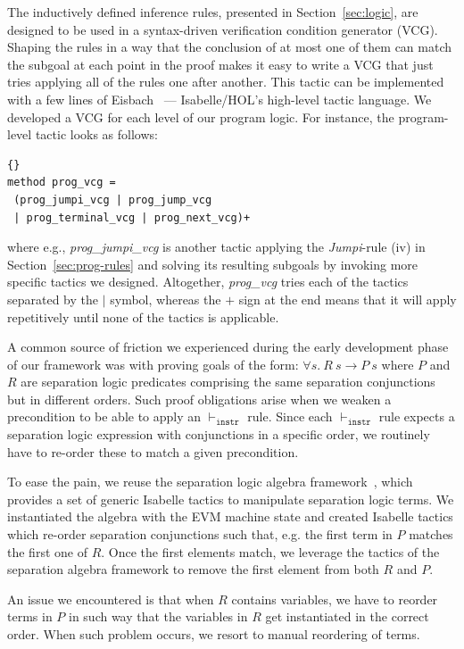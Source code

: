 \documentclass[sigplan,10pt]{acmart}\settopmatter{printfolios=true,printccs=false,printacmref=false}
\begin{document}
The inductively defined inference rules, presented in Section~\ref{sec:logic},
are designed to be used in a syntax-driven verification
condition generator (VCG).
Shaping the rules in a way that the conclusion of at most one of them
can match the subgoal at each point in the
proof makes it easy to write a VCG that just tries applying all of the rules
one after another.
This tactic can be implemented with a few lines of Eisbach~\cite{Matichuk_MW_16} ---
Isabelle/HOL's high-level tactic language.
We developed a VCG for each level of our program logic.
For instance, the program-level tactic looks as follows:
\begin{lstlisting}[language=Isar]{}
method prog_vcg =
 (prog_jumpi_vcg | prog_jump_vcg
 | prog_terminal_vcg | prog_next_vcg)+
\end{lstlisting}
where e.g., \textit{prog\_jumpi\_vcg} is another tactic applying the \textit{Jumpi}-rule (iv) 
in Section~\ref{sec:prog-rules} and solving its resulting subgoals by
invoking more specific tactics we designed.
Altogether, \textit{prog\_vcg} tries each of the tactics separated by the $|$ symbol,
whereas the $+$ sign at the end means that it will apply repetitively until
none of the tactics is applicable. 

A common source of friction we experienced during the early development phase
of our framework was with proving goals of the form:
$\forall s.\: R\:s \longrightarrow P\:s$ where $P$ and $R$ are separation logic predicates
comprising the same separation conjunctions but in different orders.
Such proof obligations arise when we weaken a precondition to be
able to apply an $\vdash_\mathtt{instr}$ rule.
Since each $\vdash_\mathtt{instr}$ rule expects a separation logic expression with conjunctions
in a specific order, we routinely have to re-order these to
match a given precondition.

To ease the pain, we reuse the separation logic algebra framework~\cite{Klein_KB_12},
which provides a set of generic Isabelle tactics to manipulate separation logic terms.
We instantiated the algebra with the EVM machine state and created Isabelle tactics
which re-order separation conjunctions such that, e.g. %
the first term in $P$ matches the first one of $R$.
Once the first elements match, we leverage the tactics of the separation
algebra framework to remove the first element from both $R$ and $P$.

An issue we encountered is that when $R$ contains variables,
we have to reorder terms in $P$ in such way that the variables in $R$ get instantiated
in the correct order.
When such problem occurs, we resort to manual reordering of terms. %
%
\end{document}
